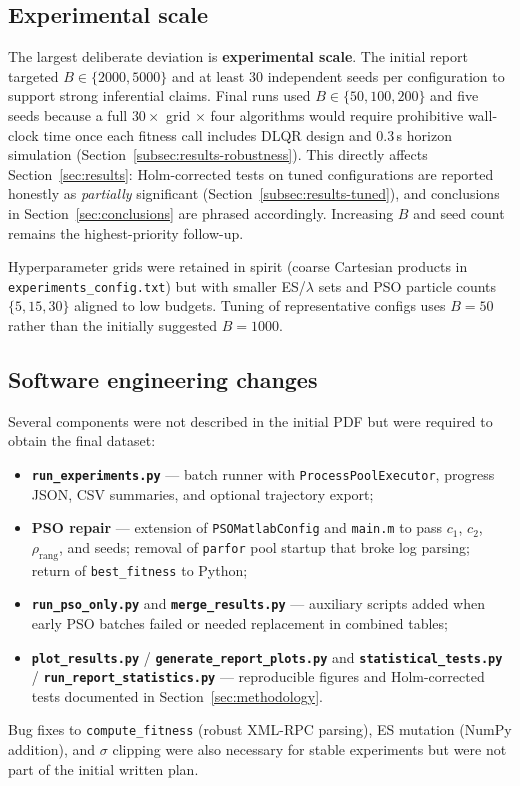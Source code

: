\documentclass[pdflatex,sn-mathphys-num]{sn-jnl}
\begin{document}
\subsection{Experimental scale}

The largest deliberate deviation is \textbf{experimental scale}.
The initial report targeted $B\in\{2000,5000\}$ and at least $30$ independent seeds per configuration to support strong inferential claims.
Final runs used $B\in\{50,100,200\}$ and five seeds because a full $30\times$ grid $\times$ four algorithms would require prohibitive wall-clock time once each fitness call includes DLQR design and $0.3$\,s horizon simulation (Section~\ref{subsec:results-robustness}).
This directly affects Section~\ref{sec:results}: Holm-corrected tests on tuned configurations are reported honestly as \emph{partially} significant (Section~\ref{subsec:results-tuned}), and conclusions in Section~\ref{sec:conclusions} are phrased accordingly.
Increasing $B$ and seed count remains the highest-priority follow-up.

Hyperparameter grids were retained in spirit (coarse Cartesian products in \texttt{experiments\_config.txt}) but with smaller ES/$\lambda$ sets and PSO particle counts $\{5,15,30\}$ aligned to low budgets.
Tuning of representative configs uses $B=50$ rather than the initially suggested $B=1000$.

\subsection{Software engineering changes}

Several components were not described in the initial PDF but were required to obtain the final dataset:
\begin{itemize}
  \item \textbf{\texttt{run\_experiments.py}} --- batch runner with \texttt{ProcessPoolExecutor}, progress JSON, CSV summaries, and optional trajectory export;
  \item \textbf{PSO repair} --- extension of \texttt{PSOMatlabConfig} and \texttt{main.m} to pass $c_1$, $c_2$, $\rho_{\mathrm{rang}}$, and seeds; removal of \texttt{parfor} pool startup that broke log parsing; return of \texttt{best\_fitness} to Python;
  \item \textbf{\texttt{run\_pso\_only.py}} and \textbf{\texttt{merge\_results.py}} --- auxiliary scripts added when early PSO batches failed or needed replacement in combined tables;
  \item \textbf{\texttt{plot\_results.py}} / \textbf{\texttt{generate\_report\_plots.py}} and \textbf{\texttt{statistical\_tests.py}} / \textbf{\texttt{run\_report\_statistics.py}} --- reproducible figures and Holm-corrected tests documented in Section~\ref{sec:methodology}.
\end{itemize}
Bug fixes to \texttt{compute\_fitness} (robust XML-RPC parsing), ES mutation (NumPy addition), and $\sigma$ clipping were also necessary for stable experiments but were not part of the initial written plan.
\end{document}
